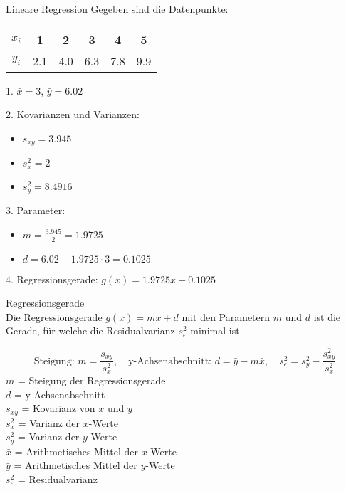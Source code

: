 \begin{example2}{Lineare Regression}
Gegeben sind die Datenpunkte:
\begin{center}
\begin{tabular}{|c|c|c|c|c|c|}
\hline
$x_i$ & 1 & 2 & 3 & 4 & 5 \\
\hline
$y_i$ & 2.1 & 4.0 & 6.3 & 7.8 & 9.9 \\
\hline
\end{tabular}
\end{center}

1. $\bar{x} = 3$, $\bar{y} = 6.02$

2. Kovarianzen und Varianzen:
   \begin{itemize}
     \item $s_{xy} = 3.945$
     \item $s_x^2 = 2$
     \item $s_y^2 = 8.4916$
   \end{itemize}

3. Parameter:
   \begin{itemize}
     \item $m = \frac{3.945}{2} = 1.9725$
     \item $d = 6.02 - 1.9725 \cdot 3 = 0.1025$
   \end{itemize}

4. Regressionsgerade: $g(x) = 1.9725x + 0.1025$
\end{example2}

\begin{theorem}{Regressionsgerade}\\
Die Regressionsgerade $g(x)=mx+d$ mit den Parametern $m$ und $d$ ist die Gerade, für welche die Residualvarianz $s_{\epsilon}^2$ minimal ist.

$$
\text{Steigung: } m=\frac{s_{xy}}{s_x^2}, \quad \text{y-Achsenabschnitt: } d=\bar{y}-m\bar{x}, \quad s_{\epsilon}^2=s_y^2-\frac{s_{xy}^2}{s_x^2}
$$
$m$ = Steigung der Regressionsgerade\\
$d$ = y-Achsenabschnitt\\
$s_{xy}$ = Kovarianz von $x$ und $y$\\
$s_x^2$ = Varianz der $x$-Werte\\
$s_y^2$ = Varianz der $y$-Werte\\
$\bar{x}$ = Arithmetisches Mittel der $x$-Werte\\
$\bar{y}$ = Arithmetisches Mittel der $y$-Werte\\
$s_{\epsilon}^2$ = Residualvarianz\\
\end{theorem}



